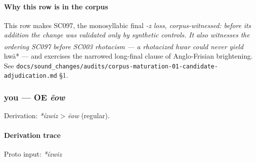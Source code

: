 \documentclass[
  british,
  a4paper,
]{article}
\providecommand{\Pred}[1]{\textsuperscript{\dag}\emph{#1}}
\begin{document}
\paragraph{Why this row is in the
corpus}\label{why-this-row-is-in-the-corpus}

This row makes SC097, the monosyllabic final \emph{-z loss,
corpus-witnessed: before its addition the change was validated only by
synthetic controls. It also witnesses the ordering SC097 before SC003
rhotacism --- a rhotacized \Pred{hwar} could never yield }hwā* --- and
exercises the narrowed long-final clause of Anglo-Frisian brightening.
See
\texttt{docs/sound\_changes/audits/corpus-maturation-01-candidate-adjudication.md}
§1.

\subsubsection{\texorpdfstring{you --- OE
\emph{ēow}}{you --- OE ēow}}\label{you-oe-ux113ow}

Derivation: \emph{*ízwiz} \textgreater{} \emph{ēow} (regular).

\paragraph{Derivation trace}\label{derivation-trace-79}

Proto input: \emph{*ízwiz}

\begingroup
\setlength{\fboxsep}{6pt}
\end{document}
